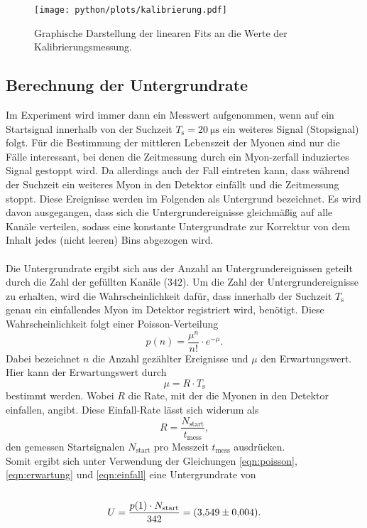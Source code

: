 \begin{figure}
  \centering
  \texttt{[image: python/plots/kalibrierung.pdf]}
  \caption{Graphische Darstellung der linearen Fits an die Werte der Kalibrierungsmessung.}
  \label{fig:kalibrierung}
\end{figure}
\FloatBarrier
\subsection{Berechnung der Untergrundrate}
\label{subsec:a2}
Im Experiment wird immer dann ein Messwert aufgenommen, wenn auf ein Startsignal
innerhalb von der Suchzeit $T_\text{s} = \SI{20}{\micro\second}$ ein weiteres
Signal (Stopsignal) folgt. Für die Bestimmung der mittleren Lebenszeit der Myonen
sind nur die Fälle interessant, bei denen die Zeitmessung durch ein Myon-zerfall
induziertes Signal gestoppt wird. Da allerdings auch der Fall eintreten kann,
dass während der Suchzeit ein weiteres Myon in den Detektor einfällt und
die Zeitmessung stoppt. Diese Ereignisse werden im Folgenden als Untergrund bezeichnet.
Es wird davon ausgegangen, dass sich die Untergrundereignisse gleichmäßig auf
alle Kanäle verteilen, sodass eine konstante Untergrundrate zur Korrektur
von dem Inhalt jedes (nicht leeren) Bins abgezogen wird.\\ \\
Die Untergrundrate ergibt sich aus der Anzahl an Untergrundereignissen geteilt
durch die Zahl der gefüllten Kanäle ($342$).
Um die Zahl der Untergrundereignisse zu erhalten,
wird die Wahrscheinlichkeit dafür, dass innerhalb der Suchzeit $T_\text{s}$
genau ein einfallendes Myon im Detektor registriert wird, benötigt. Diese
Wahrscheinlichkeit folgt einer Poisson-Verteilung\cite{poisson}
\begin{equation}
  \label{eqn:poisson}
  p(n) = \frac{\mu^{n}}{n!} \cdot e^{-\mu}.
\end{equation}
Dabei bezeichnet $n$ die Anzahl gezählter Ereignisse und $\mu$ den
Erwartungswert.\\ Hier kann der Erwartungswert durch
\begin{equation}
  \label{eqn:erwartung}
  \mu = R \cdot T_\text{s}
\end{equation}
bestimmt werden. Wobei $R$ die Rate, mit der die Myonen in den Detektor einfallen,
angibt. Diese Einfall-Rate lässt sich widerum als
\begin{equation}
  \label{eqn:einfall}
  R = \frac{N_\text{start}}{t_\text{mess}},
\end{equation}
den gemessen Startsignalen $N_\text{start}$ pro Messzeit $t_\text{mess}$ ausdrücken.\\
Somit ergibt sich unter Verwendung der Gleichungen \eqref{eqn:poisson},
\eqref{eqn:erwartung} und \eqref{eqn:einfall}
eine Untergrundrate von\\ \\
\begin{align*}
  U =  \frac{p(1) \cdot N_\text{start}}{342} = \SI{3.549+-0.004}{} .
\end{align*}


